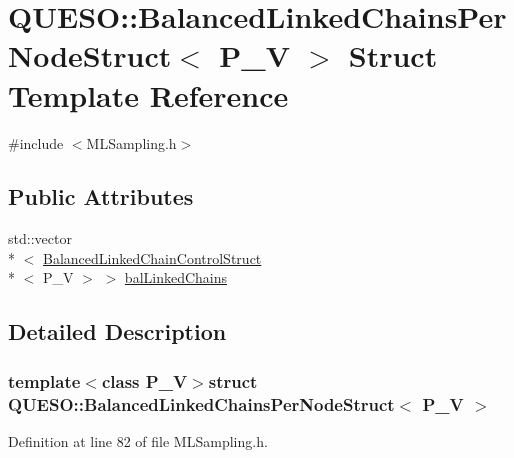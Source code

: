 \hypertarget{struct_q_u_e_s_o_1_1_balanced_linked_chains_per_node_struct}{\section{Q\-U\-E\-S\-O\-:\-:Balanced\-Linked\-Chains\-Per\-Node\-Struct$<$ P\-\_\-\-V $>$ Struct Template Reference}
\label{struct_q_u_e_s_o_1_1_balanced_linked_chains_per_node_struct}
}


{\ttfamily \#include $<$M\-L\-Sampling.\-h$>$}

\subsection*{Public Attributes}
\begin{DoxyCompactItemize}
\item 
std\-::vector\\*
$<$ \hyperlink{struct_q_u_e_s_o_1_1_balanced_linked_chain_control_struct}{Balanced\-Linked\-Chain\-Control\-Struct}\\*
$<$ P\-\_\-\-V $>$ $>$ \hyperlink{struct_q_u_e_s_o_1_1_balanced_linked_chains_per_node_struct_ad8a7fce965f7c04bdd0968a94e6e819c}{bal\-Linked\-Chains}
\end{DoxyCompactItemize}


\subsection{Detailed Description}
\subsubsection*{template$<$class P\-\_\-\-V$>$struct Q\-U\-E\-S\-O\-::\-Balanced\-Linked\-Chains\-Per\-Node\-Struct$<$ P\-\_\-\-V $>$}



Definition at line 82 of file M\-L\-Sampling.\-h.



